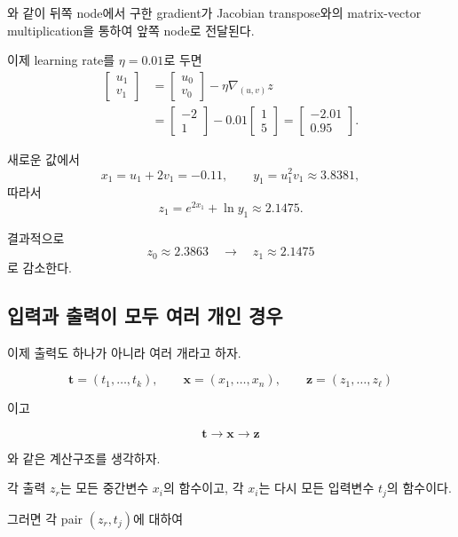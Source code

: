 \documentclass[11pt,a4paper]{article}
\begin{document}
와 같이 뒤쪽 node에서 구한 gradient가 Jacobian transpose와의
matrix-vector multiplication을 통하여 앞쪽 node로 전달된다.

이제 learning rate를 $\eta=0.01$로 두면
\[
\begin{aligned}
\begin{bmatrix}
u_1\\
v_1
\end{bmatrix}
&=
\begin{bmatrix}
u_0\\
v_0
\end{bmatrix}
-
\eta\nabla_{(u,v)}z
\\
&=
\begin{bmatrix}
-2\\
1
\end{bmatrix}
-
0.01
\begin{bmatrix}
1\\
5
\end{bmatrix}
=
\begin{bmatrix}
-2.01\\
0.95
\end{bmatrix}.
\end{aligned}
\]

새로운 값에서
\[
x_1=u_1+2v_1=-0.11,
\qquad
y_1=u_1^2v_1\approx3.8381,
\]
따라서
\[
z_1=e^{2x_1}+\ln y_1\approx2.1475.
\]

결과적으로
\[
\boxed{
z_0\approx2.3863
\quad\longrightarrow\quad
z_1\approx2.1475
}
\]
로 감소한다.

\bigskip

\subsection{입력과 출력이 모두 여러 개인 경우}

이제 출력도 하나가 아니라 여러 개라고 하자.

\[
\mathbf t
=
(t_1,\ldots,t_k),
\qquad
\mathbf x
=
(x_1,\ldots,x_n),
\qquad
\mathbf z
=
(z_1,\ldots,z_\ell)
\]

이고

\[
\mathbf t
\longrightarrow
\mathbf x
\longrightarrow
\mathbf z
\]

와 같은 계산구조를 생각하자.

각 출력 $z_r$는 모든 중간변수 $x_i$의 함수이고,
각 $x_i$는 다시 모든 입력변수 $t_j$의 함수이다.

그러면 각 pair $(z_r,t_j)$에 대하여
\end{document}
